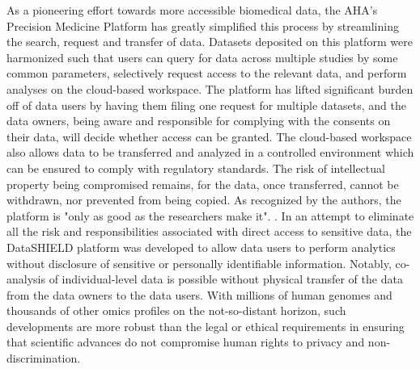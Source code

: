 \documentclass[letter]{bioinfo}
\begin{document}
	As a pioneering effort towards more accessible biomedical data, the AHA's Precision Medicine Platform \citep{Kass-Hout:2018:American} has greatly simplified this process by streamlining the search, request and transfer of data. Datasets deposited on this platform were harmonized such that users can query for data across multiple studies by some common parameters, selectively request access to the relevant data, and perform analyses on the cloud-based workspace. The platform has lifted significant burden off of data users by having them filing one request for multiple datasets, and the data owners, being aware and responsible for complying with the consents on their data, will decide whether access can be granted. The cloud-based workspace also allows data to be transferred and analyzed in a controlled environment which can be ensured to comply with regulatory standards. The risk of intellectual property being compromised remains, for the data, once transferred, cannot be withdrawn, nor prevented from being copied. As recognized by the authors, the platform is "only as good as the researchers make it". \citep{Kass-Hout:2018:American}.  In an attempt to eliminate all the risk and responsibilities associated with direct access to sensitive data, the DataSHIELD platform was developed \citep{Gaye:2014:DataSHIELD, Wilson:2017:DataSHIELD} to allow data users to perform analytics without disclosure of sensitive or personally identifiable information. Notably, co-analysis of individual-level data is possible without physical transfer of the data from the data owners to the data users. With millions of human genomes and thousands of other omics profiles on the not-so-distant horizon, such developments are more robust than the legal or ethical requirements in ensuring that scientific advances do not compromise human rights to privacy and non-discrimination.
	
\end{document}
